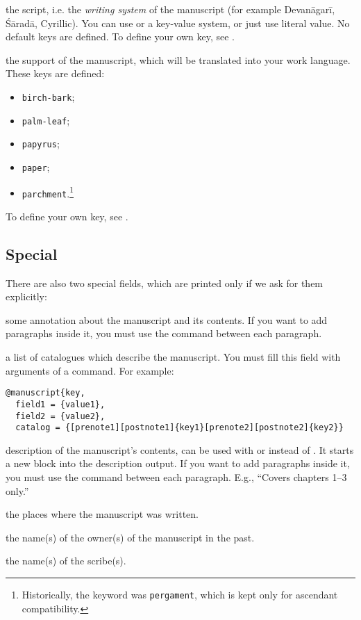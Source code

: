 \documentclass{ltxdockit}[2011/03/25]
\begin{document}
\begin{fieldlist}
 the script, i.e. the \emph{writing system} of the 
manuscript (for example Devanāgarī, Śāradā, Cyrillic).
 You can use or a key-value system, or just use literal value. No default keys are defined.
 To define your own key, see .
 

  the support of the manuscript, which will be translated into your work language. These keys are defined: \begin{itemize}
  \item \texttt{birch-bark};
  \item \texttt{palm-leaf};
  \item \texttt{papyrus};
  \item \texttt{paper};
  \item \texttt{parchment}.\footnote{Historically, 
  the keyword was \texttt{pergament}, which is kept only for ascendant compatibility.}
\end{itemize}
 To define your own key, see .
\end{fieldlist}

\subsection{Special}\label{fields:special}
There are also two special fields, which are printed only if we ask for them explicitly:

\begin{fieldlist}
 some annotation about the manuscript and its contents. If you want to add paragraphs inside it, you must use the  command between each paragraph.


 a list of catalogues which describe the manuscript. You must fill this field with arguments of a  command. For example:

\begin{verbatim}
@manuscript{key,
  field1 = {value1},
  field2 = {value2},
  catalog = {[prenote1][postnote1]{key1}[prenote2][postnote2]{key2}}
\end{verbatim}

 description of the manuscript's contents, can be used 
with or instead of . It starts a new block into the description 
output. If you want to add paragraphs inside it, you must use the  
command between each paragraph.  E.g., ``Covers chapters 1--3 only.''


 the places where the manuscript was written.

 the name(s) of the owner(s) of the manuscript in the past.

 the name(s) of the scribe(s).

\end{fieldlist}
\end{document}
